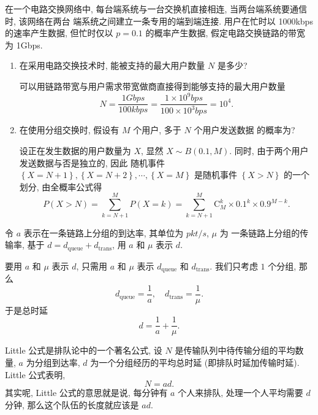 \documentclass[10pt,UTF8]{ctexbook} %
\begin{document}
\begin{example}
    在一个电路交换网络中, 每台端系统与一台交换机直接相连, 当两台端系统要通信时, 该网络在两台
    端系统之间建立一条专用的端到端连接.
    用户在忙时以 1000kbps 的速率产生数据, 但忙时仅以 $p=0.1$ 的概率产生数据,
    假定电路交换链路的带宽为 1Gbps.
    \begin{enumerate}[label={$\left.\mathrm{\alph*}\right)$}, itemsep=0pt]
        \item 在采用电路交换技术时, 能被支持的最大用户数量 $N$ 是多少?
        \begin{sol}
            可以用链路带宽与用户需求带宽做商直接得到能够支持的最大用户数量
            \[ N = \dfrac{1\si{Gbps}}{100\si{kbps}}
            = \dfrac{1 \times 10^9 \si{bps}}{100 \times 10^3 \si{bps}}
            = 10^4. \]
        \end{sol}
        \item 在使用分组交换时, 假设有 $M$ 个用户, 多于 $N$ 个用户发送数据
        的概率为?
        \begin{sol}
            设正在发生数据的用户数量为 $X$, 显然 $X \sim B(0.1, M)$. 同时,
            由于两个用户发送数据与否是独立的, 因此
            随机事件 $\left\{ X=N+1 \right\},
            \left\{ X=N+2 \right\},
            \cdots,
            \left\{ X=M \right\}$
            是随机事件 $\left\{ X>N \right\}$ 的一个划分, 由全概率公式得
            \[ P(X>N) = \sum_{k=N+1}^{M} P(X=k)
            = \sum_{k=N+1}^{M} \mathrm{C}_M^k \times 0.1^k \times 0.9^{M-k}. \]
        \end{sol}
    \end{enumerate}
\end{example}

\begin{example}
    令 $a$ 表示在一条链路上分组的到达率, 其单位为 $\si{pkt/s}$, $\mu$ 为
    一条链路上分组的传输率, 基于 $d = d_\mathrm{queue} + d_\mathrm{trans}$,
    用 $a$ 和 $\mu$ 表示 $d$.
    \begin{sol}
        要用 $a$ 和 $\mu$ 表示 $d$, 只需用 $a$ 和 $\mu$ 表示
        $d_\mathrm{queue}$ 和 $d_\mathrm{trans}$. 我们只考虑 $1$ 个分组, 那么
        \[ d_\mathrm{queue} = \dfrac{1}{a}, \quad 
        d_\mathrm{trans} = \dfrac{1}{\mu}. \]
        于是总时延
        \[ d = \dfrac{1}{a} + \dfrac{1}{\mu}. \]
    \end{sol}
\end{example}

Little 公式是排队论中的一个著名公式, 设 $N$ 是传输队列中待传输分组的平均数量,
$a$ 为分组到达率, $d$ 为一个分组经历的平均总时延 (即排队时延加传输时延).
Little 公式表明,
\[ N = ad. \]
其实呢, Little 公式的意思就是说, 每分钟有 $a$ 个人来排队,
处理一个人平均需要 $d$ 分钟, 那么这个队伍的长度就应该是 $ad$.
\end{document}
